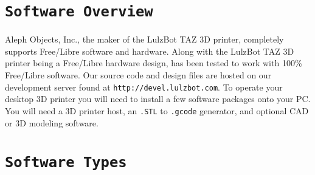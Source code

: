 %
%
%
%
%

\section{\texttt{Software Overview}}

Aleph Objects, Inc., the maker of the LulzBot\textsuperscript{\miniscule{\texttrademark}} TAZ 3D printer, completely supports Free/Libre software and hardware. Along with the LulzBot\textsuperscript{\miniscule{\texttrademark}} TAZ 3D printer being a Free/Libre hardware design, has been tested to work with 100\% Free/Libre software. Our source code and design files are hosted on our development server found at \texttt{http://devel.lulzbot.com}.
To operate your desktop 3D printer you will need to install a few software packages onto your PC. You will need a 3D printer host, an \texttt{.STL} to \texttt{.gcode} generator, and optional CAD or 3D modeling software.

\section{\texttt{Software Types}}

